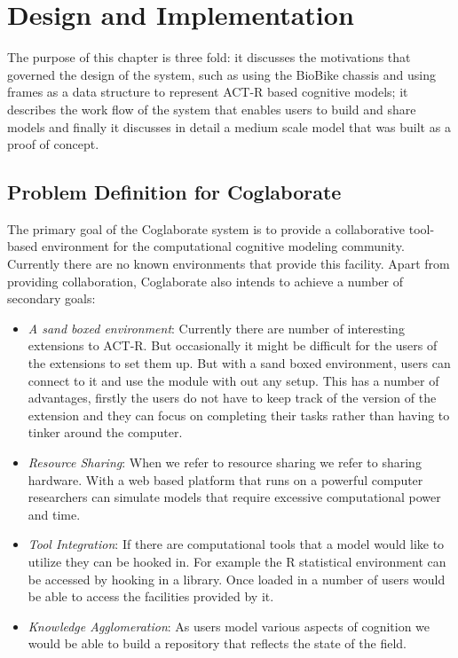 \chapter{Design and Implementation}
\label{chap-five}



The purpose of this chapter is three fold: it discusses the motivations
that governed the design of the system, such as using the
BioBike\cite{journals/bioinformatics/MassarTES05} chassis and using
frames as a data structure to represent ACT-R based cognitive models;
it describes the work flow of the system that enables users to build
and share models and finally it discusses in detail a medium scale
model that was built as a proof of concept.

\section{Problem Definition for Coglaborate}


The primary goal of the Coglaborate system is to provide a
collaborative tool-based environment for the computational cognitive
modeling community. Currently there are no known environments that
provide this facility. Apart from providing collaboration, Coglaborate
also intends to achieve a number of secondary goals:

\begin{itemize}
\item \emph{A sand boxed environment}: Currently there are number of
  interesting extensions to ACT-R. But occasionally it might be
  difficult for the users of the extensions to set them up. But with a
  sand boxed environment, users can connect to it and use the module
  with out any setup. This has a number of advantages, firstly the
  users do not have to keep track of the version of the extension and
  they can focus on completing their tasks rather than having to
  tinker around the computer.
\item \emph{Resource Sharing}: When we refer to resource sharing we refer to
  sharing hardware. With a web based platform that runs on a powerful
  computer researchers can simulate models that require excessive
  computational power and time.
\item \emph{Tool Integration}: If there are computational tools that a model
  would like to utilize they can be hooked in. For example the R
  statistical environment can be accessed by hooking in a
  library. Once loaded in a number of users would be able to access
  the facilities provided by it.
\item \emph{Knowledge Agglomeration}: As users model various aspects
  of cognition we would be able to build a repository that reflects
  the state of the field.
\end{itemize}

